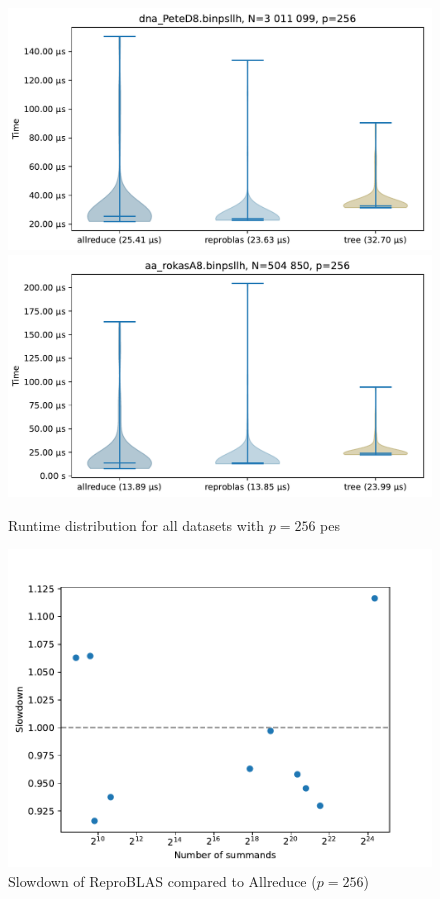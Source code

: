 \begin{figure}\centering\ContinuedFloat
\includegraphics[scale=\mScale]{figures/violinPeteD8.pdf}
\includegraphics[scale=\mScale]{figures/violinRokasA8.pdf}

\caption{Runtime distribution for all datasets with $p=256$ \glspl{pe}}

\end{figure}

\begin{figure}
\centering
\includegraphics[scale=\mScale]{figures/slowdownAllreduceReproblas.pdf}
\caption{Slowdown of ReproBLAS compared to Allreduce ($p = 256$)}
\label{fig:slowdownAllreduceReproblas}
\end{figure}

